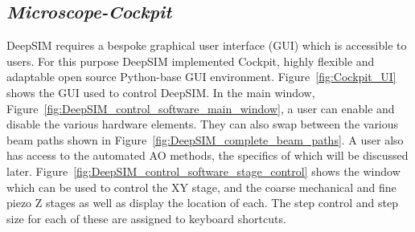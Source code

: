 \subsection{\textit{Microscope-Cockpit}}
\label{subsec:cockpit}

DeepSIM requires a bespoke graphical user interface (GUI) which is accessible to users. For this purpose DeepSIM implemented Cockpit, highly flexible and adaptable open source Python-base GUI environment. Figure~\ref{fig:Cockpit_UI} shows the GUI used to control DeepSIM. In the main window, Figure~\ref{fig:DeepSIM_control_software_main_window}, a user can enable and disable the various hardware elements. They can also swap between the various beam paths shown in Figure~\ref{fig:DeepSIM_complete_beam_paths}. A user also has access to the automated AO methods, the specifics of which will be discussed later. Figure~\ref{fig:DeepSIM_control_software_stage_control} shows the window which can be used to control the XY stage, and the coarse mechanical and fine piezo Z stages as well as display the location of each. The step control and step size for each of these are assigned to keyboard shortcuts. 

